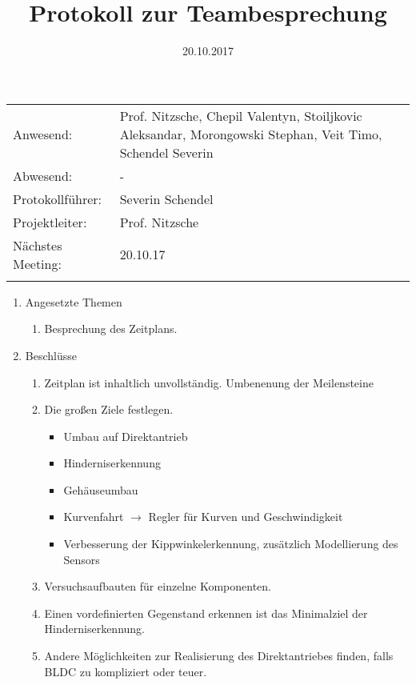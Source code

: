 \documentclass[10pt]{scrartcl}
\title{Protokoll zur Teambesprechung}
\date{20.10.2017}%
\begin{document}
\maketitle
\thispagestyle{empty}

\begin{tabularx}{\textwidth}{lp{9 cm}} 
Anwesend: & Prof. Nitzsche, Chepil Valentyn, Stoiljkovic Aleksandar, Morongowski Stephan,  Veit Timo, Schendel Severin\\%
Abwesend: & - \\
Protokollführer: & Severin Schendel \\
Projektleiter: & Prof. Nitzsche\\
Nächstes Meeting: & 20.10.17 \\%
&\\
\end{tabularx}

\begin{enumerate}
	\item Angesetzte Themen
		\begin{enumerate}
			\item Besprechung des Zeitplans.%
		\end{enumerate}
	\item Beschlüsse
		\begin{enumerate}
			\item Zeitplan ist inhaltlich unvollständig. Umbenenung der Meilensteine%
			\item Die großen Ziele festlegen.
			\begin{itemize}
				\item Umbau auf Direktantrieb
				\item Hinderniserkennung
				\item Gehäuseumbau
				\item Kurvenfahrt $\rightarrow$ Regler für Kurven und Geschwindigkeit
				\item Verbesserung der Kippwinkelerkennung, zusätzlich Modellierung des Sensors
			\end{itemize}
			\item Versuchsaufbauten für einzelne Komponenten.
			\item Einen vordefinierten Gegenstand erkennen ist das Minimalziel der Hinderniserkennung.
			\item Andere Möglichkeiten zur Realisierung des Direktantriebes finden, falls BLDC zu kompliziert oder teuer.
		\end{enumerate}

	\end{enumerate}
\end{document}
